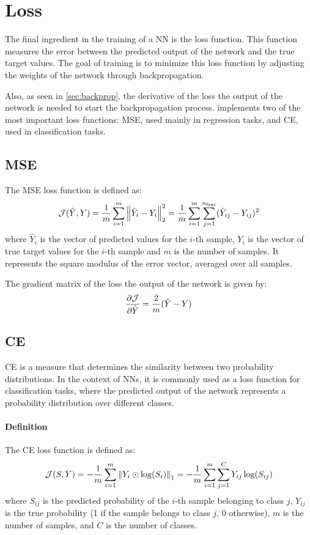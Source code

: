\section{Loss} \label{sec:loss}

The final ingredient in the training of a \acl{NN} is the loss function. This function measures the error between the predicted output of the network and the true target values. The goal of training is to minimize this loss function by adjusting the weights of the network through backpropagation.

Also, as seen in \cref{sec:backprop}, the derivative of the loss \wrt the output of the network is needed to start the backpropagation process. \mfnet implements two of the most important loss functions: \ac{MSE}, used mainly in regression tasks, and \ac{CE}, used in classification tasks.

\subsection{\acl{MSE}}
The \ac{MSE} loss function is defined as:
\begin{equation}
    \mathcal{J}(\hat{Y}, Y) = \frac{1}{m} \sum_{i=1}^{m} \norm{\hat{Y}_i - Y_i}_2^2 = \frac{1}{m} \sum_{i=1}^{m} \sum_{j=1}^{n_\text{feat}} (\hat{Y}_{ij} - Y_{ij})^2
\end{equation}
where $\hat{Y}_i$ is the vector of predicted values for the $i$-th sample, $Y_i$ is the vector of true target values for the $i$-th sample and $m$ is the number of samples. It represents the square modulus of the error vector, averaged over all samples.

The gradient matrix of the loss \wrt the output of the network is given by:
\begin{equation}
    \pdv{\mathcal{J}}{\hat{Y}} = \frac{2}{m} (\hat{Y} - Y)
\end{equation}

\subsection{\acl{CE}}
\acl{CE} is a measure that determines the similarity between two probability distributions. In the context of \aclp{NN}, it is commonly used as a loss function for classification tasks, where the predicted output of the network represents a probability distribution over different classes.

\paragraph{Definition}
The \ac{CE} loss function is defined as:
\begin{equation}
    \mathcal{J}(S, Y) = -\frac{1}{m} \sum_{i=1}^{m} \norm{Y_i \odot \log(S_i)}_1 = -\frac{1}{m} \sum_{i=1}^{m} \sum_{j=1}^{C} Y_{ij} \log(S_{ij})
\end{equation}
where $S_{ij}$ is the predicted probability of the $i$-th sample belonging to class $j$, $Y_{ij}$ is the true probability (1 if the sample belongs to class $j$, 0 otherwise), $m$ is the number of samples, and $C$ is the number of classes.

